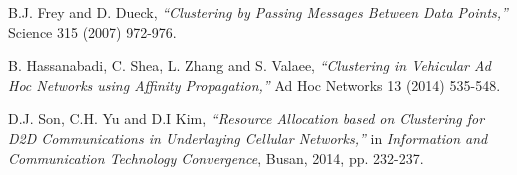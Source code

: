 \documentclass[10pt, conference, letterpaper]{IEEEtran}
\begin{document}
\begin{thebibliography}{50}
B.J. Frey and D. Dueck, \emph{``Clustering by Passing Messages Between Data Points,''} Science 315 (2007) 972-976.

B. Hassanabadi, C. Shea, L. Zhang and S. Valaee, \emph{``Clustering in Vehicular Ad Hoc Networks using Affinity Propagation,''} Ad Hoc Networks 13 (2014) 535-548.

D.J. Son, C.H. Yu and D.I Kim, \emph{``Resource Allocation based on Clustering for D2D Communications in Underlaying Cellular Networks,''} in \emph{Information and Communication Technology Convergence}, Busan, 2014, pp. 232-237.

\end{thebibliography}
\end{document}
